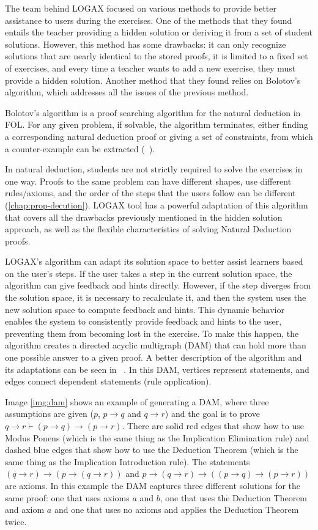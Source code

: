 The team behind LOGAX focused on various methods to provide better assistance to users during the exercises. One of the methods that they found entails the teacher providing a hidden solution or deriving it from a set of student solutions. However, this method has some drawbacks: it can only recognize solutions that are nearly identical to the stored proofs, it is limited to a fixed set of exercises, and every time a teacher wants to add a new exercise, they must provide a hidden solution. Another method that they found relies on Bolotov's algorithm, which addresses all the issues of the previous method.

Bolotov's algorithm is a proof searching algorithm for the natural deduction in \gls{FOL}.
For any given problem, if solvable, the algorithm terminates, either finding a corresponding natural deduction proof or giving a set of constraints, from which a counter-example can be extracted (~\cite{bolotov_2005_automated}).

In natural deduction, students are not strictly required to solve the exercises in one way. Proofs to the same problem can have different shapes, use different rules/axioms, and the order of the steps that the users follow can be different (\ref{chap:prop-decution}). LOGAX tool has a powerful adaptation of this algorithm that covers all the drawbacks previously mentioned in the hidden solution approach, as well as the flexible characteristics of solving Natural Deduction proofs. 

LOGAX's algorithm can adapt its solution space to better assist learners based on the user's steps. If the user takes a step in the current solution space, the algorithm can give feedback and hints directly. However, if the step diverges from the solution space, it is necessary to recalculate it, and then the system uses the new solution space to compute feedback and hints. This dynamic behavior enables the system to consistently provide feedback and hints to the user, preventing them from becoming lost in the exercise. To make this happen, the algorithm creates a directed acyclic multigraph (\gls{DAM}) that can hold more than one possible answer to a given proof. A better description of the algorithm and its adaptations can be seen in ~\cite{lodder_2020_generation, bolotov_2005_automated}. In this \gls{DAM}, vertices represent statements, and edges connect dependent statements (rule application).

Image \ref{img:dam} shows an example of generating a \gls{DAM}, where three assumptions are given (\(p\), \(p \to q\) and \(q \to r\)) and the goal is to prove \( q \to r \vdash (p \to q) \to (p \to r) \). There are solid red edges that show how to use Modus Ponens (which is the same thing as the Implication Elimination rule) and dashed blue edges that show how to use the Deduction Theorem (which is the same thing as the Implication Introduction rule). The statements \((q \to r) \to (p \to (q \to r)) \) and \( p \to (q \to r) \to ((p \to q) \to (p \to r)) \) are axioms. In this example the \gls{DAM} captures three different solutions for the same proof: one that uses axioms \(a\) and \(b\), one that uses the Deduction Theorem and axiom \(a\) and one that uses no axioms and applies the Deduction Theorem twice.

